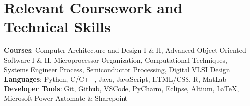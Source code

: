 \documentclass[letterpaper,11pt]{article}
\begin{document}
\section{Relevant Coursework and Technical Skills}
 \begin{itemize}[leftmargin=0.22in, label={}]
    \small{\item{
      \textbf{Courses}{: Computer Architecture and Design I \& II, Advanced Object Oriented Software I \& II, 
      Microprocessor Organization,  Computational Techniques, Systems Engineer Process, Semiconductor Processing, Digital VLSI Design} \\
     \textbf{Languages}{: Python, C/C++, Java, JavaScript, HTML/CSS, R, MatLab} \\
     \textbf{Developer Tools}{: Git, Github, VSCode, PyCharm, Eclipse, Altium, LaTeX, Microsoft Power Automate \& Sharepoint} \\
    }}
 \end{itemize}


\end{document}
